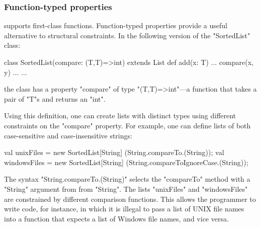 
\subsubsection{Function-typed properties}

\Xten{} supports first-class functions.
Function-typed properties provide a useful alternative to
structural constraints.  In the
following version of the
\xcd"SortedList" class:
{
\begin{xten}
class SortedList(compare: (T,T)=>int)
  extends List {
    def add(x: T) {... compare(x, y) ...}
    ...
}
\end{xten}}
\noindent
the class has a property \xcd"compare" of type
\xcd"(T,T)=>int"---a function that takes a pair of \xcd"T"s and
returns an \xcd"int".  

Using this definition, one can create lists with distinct types
using different constraints on the \xcd"compare" property.
For example, one can define lists of
both
case-sensitive and case-insensitive strings:
{
\begin{xten}
val unixFiles
  = new SortedList[String]
      (String.compareTo.(String));
val windowsFiles
  = new SortedList[String]
      (String.compareToIgnoreCase.(String));
\end{xten}}

\noindent
The syntax \xcd"String.compareTo.(String)" selects the
\xcd"compareTo" method with a \xcd"String" argument from
from \xcd"String".
%
The lists \xcd"unixFiles" and \xcd"windowsFiles" are constrained
by different comparison functions.  This allows the programmer
to write code, for instance, in which it is illegal to pass a list of UNIX
file names into a function that expects a list of Windows file names, and
vice versa.

